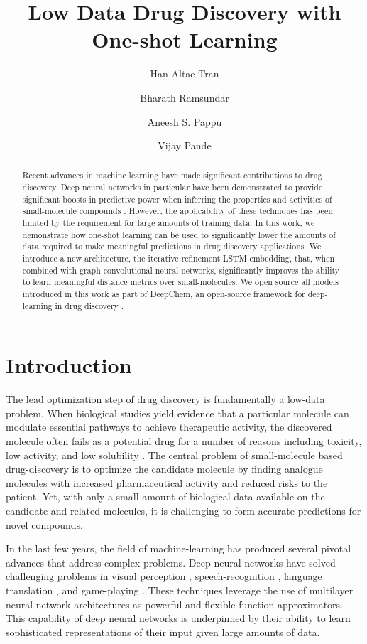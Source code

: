 \documentclass[journal=jacsat,manuscript=article]{achemso}
\author{Han Altae-Tran}
\affiliation{Department of Biological Engineering, Massachusetts Institute of Technology}
\author{Bharath Ramsundar}
\affiliation{Department of Computer Science, Stanford University}
\author{Aneesh S. Pappu}
\affiliation{Department of Computer Science, Stanford University}
\author{Vijay Pande}
\affiliation{Department of Chemistry, Stanford University}
\title{Low Data Drug Discovery with One-shot Learning}
\begin{document}
\maketitle

\begin{abstract}
Recent advances in machine learning have made significant contributions to drug discovery. Deep neural networks in particular have been demonstrated to provide significant boosts in predictive power when inferring the properties and activities of small-molecule compounds \cite{ma2015deep}. However, the applicability of these techniques has been limited by the requirement for large amounts of training data. In this work, we demonstrate how one-shot learning can be used to significantly lower the amounts of data required to make meaningful predictions in drug discovery applications. We introduce a new architecture, the iterative refinement LSTM embedding, that, when combined with graph convolutional neural networks, significantly improves the ability to learn meaningful distance metrics over small-molecules. We open source all models introduced in this work as part of DeepChem, an open-source framework for deep-learning in drug discovery
\cite{ram2016}.
\end{abstract}

\section{Introduction}
The lead optimization step of drug discovery is fundamentally a low-data problem. When biological studies yield evidence that a particular molecule can modulate essential pathways to achieve therapeutic activity, the discovered molecule often fails as a potential drug for a number of reasons including toxicity, low activity, and low solubility \cite{waring2015analysis}. The central problem of small-molecule based drug-discovery is to optimize the candidate molecule by finding analogue molecules with increased pharmaceutical activity and reduced risks to the patient. Yet, with only a small amount of biological data available on the candidate and related molecules, it is challenging to form accurate predictions for novel compounds.

In the last few years, the field of machine-learning has produced several pivotal advances that address complex problems. Deep neural networks have solved challenging problems in visual perception \cite{ILSVRC15}, speech-recognition \cite{deng2013new}, language translation \cite{wu2016google}, and game-playing \cite{silver2016mastering}. These techniques leverage the use of multilayer neural network architectures as powerful and flexible function approximators. This capability of deep neural networks is underpinned by their ability to learn sophisticated representations of their input given large amounts of data.
\end{document}
